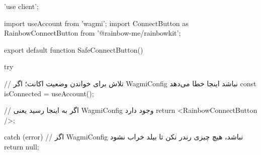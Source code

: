 'use client';

import { useAccount } from 'wagmi';
import { ConnectButton as RainbowConnectButton } from '@rainbow-me/rainbowkit';

export default function SafeConnectButton() {
  try {
    // تلاش برای خواندن وضعیت اکانت؛ اگر WagmiConfig نباشد اینجا خطا می‌دهد
    const { isConnected } = useAccount();
    
    // اگر به اینجا رسید یعنی WagmiConfig وجود دارد
    return <RainbowConnectButton />;
  } catch (error) {
    // اگر WagmiConfig نباشد، هیچ چیزی رندر نکن تا بیلد خراب نشود
    return null;
  }
}